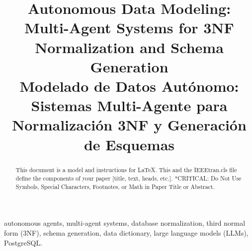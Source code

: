 \documentclass[conference]{IEEEtran}
\begin{document}
\title{Autonomous Data Modeling: Multi-Agent Systems for 3NF Normalization and Schema Generation\\
{\footnotesize Modelado de Datos Autónomo: Sistemas Multi-Agente para Normalización 3NF y Generación de Esquemas}
}

\author{
\and
{}
\and
{}

}

\maketitle

\begin{abstract}
This document is a model and instructions for \LaTeX.
This and the IEEEtran.cls file define the components of your paper [title, text, heads, etc.]. *CRITICAL: Do Not Use Symbols, Special Characters, Footnotes, 
or Math in Paper Title or Abstract.
\end{abstract}

\begin{IEEEkeywords}
autonomous agents, multi-agent systems, database normalization, third normal form (3NF), schema generation, data dictionary, large language models (LLMs), PostgreSQL.
\end{IEEEkeywords}
\end{document}
